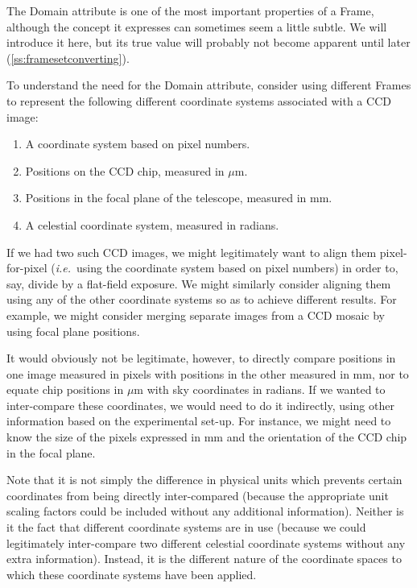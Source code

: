 \documentclass[twoside,11pt]{article}
\newcommand{\secref}[1]{\S\ref{#1}}
\renewcommand{\secref}[1]{\ref{#1}}
\begin{document}
The Domain attribute is one of the most important properties of a
Frame, although the concept it expresses can sometimes seem a little
subtle.  We will introduce it here, but its true value will probably
not become apparent until later (\secref{ss:framesetconverting}).

To understand the need for the Domain attribute, consider using
different Frames to represent the following different coordinate
systems associated with a CCD image:

\begin{enumerate}
\item A coordinate system based on pixel numbers.

\item Positions on the CCD chip, measured in $\mu$m.

\item Positions in the focal plane of the telescope, measured in mm.

\item A celestial coordinate system, measured in radians.
\end{enumerate}

If we had two such CCD images, we might legitimately want to align
them pixel-for-pixel ({\em{i.e.}}\ using the coordinate system based
on pixel numbers) in order to, say, divide by a flat-field exposure.
We might similarly consider aligning them using any of the other
coordinate systems so as to achieve different results. For example, we
might consider merging separate images from a CCD mosaic by using
focal plane positions.

It would obviously not be legitimate, however, to directly compare
positions in one image measured in pixels with positions in the other
measured in mm, nor to equate chip positions in $\mu$m with sky
coordinates in radians. If we wanted to inter-compare these
coordinates, we would need to do it indirectly, using other
information based on the experimental set-up. For instance, we might
need to know the size of the pixels expressed in mm and the
orientation of the CCD chip in the focal plane.

Note that it is not simply the difference in physical units which
prevents certain coordinates from being directly inter-compared
(because the appropriate unit scaling factors could be included
without any additional information). Neither is it the fact that
different coordinate systems are in use (because we could legitimately
inter-compare two different celestial coordinate systems without any
extra information).  Instead, it is the different nature of the
coordinate spaces to which these coordinate systems have been applied.
\end{document}
